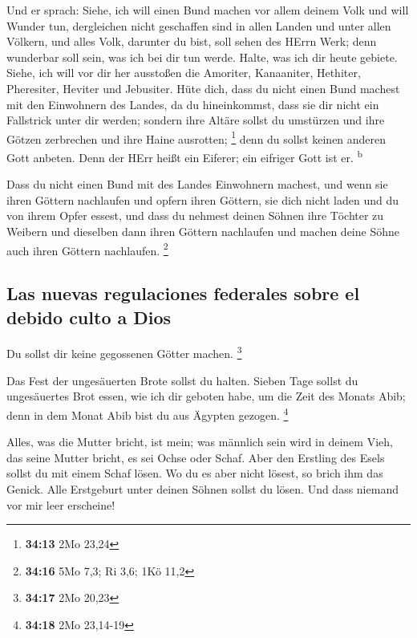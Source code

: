  Und er sprach: Siehe, ich will einen Bund machen vor
allem deinem Volk und will Wunder tun, dergleichen nicht geschaffen sind
in allen Landen und unter allen Völkern, und alles Volk, darunter du
bist, soll sehen des HErrn Werk; denn wunderbar soll sein, was ich bei
dir tun werde.  Halte, was ich dir heute gebiete. Siehe,
ich will vor dir her ausstoßen die Amoriter, Kanaaniter, Hethiter,
Pheresiter, Heviter und Jebusiter.  Hüte dich, dass du
nicht einen Bund machest mit den Einwohnern des Landes, da du
hineinkommst, dass sie dir nicht ein Fallstrick unter dir werden;
 sondern ihre Altäre sollst du umstürzen und ihre Götzen
zerbrechen und ihre Haine ausrotten; \footnote{\textbf{34:13} 2Mo 23,24}
 denn du sollst keinen anderen Gott anbeten. Denn der
HErr heißt ein Eiferer; ein eifriger Gott ist er. \textsuperscript{b}

 Dass du nicht einen Bund mit des Landes Einwohnern
machest, und wenn sie ihren Göttern nachlaufen und opfern ihren Göttern,
sie dich nicht laden und du von ihrem Opfer essest,  und
dass du nehmest deinen Söhnen ihre Töchter zu Weibern und dieselben dann
ihren Göttern nachlaufen und machen deine Söhne auch ihren Göttern
nachlaufen. \footnote{\textbf{34:16} 5Mo 7,3; Ri 3,6; 1Kö 11,2}

\hypertarget{las-nuevas-regulaciones-federales-sobre-el-debido-culto-a-dios}{%
\subsection{Las nuevas regulaciones federales sobre el debido culto a
Dios}\label{las-nuevas-regulaciones-federales-sobre-el-debido-culto-a-dios}}

 Du sollst dir keine gegossenen Götter machen.
\footnote{\textbf{34:17} 2Mo 20,23}

 Das Fest der ungesäuerten Brote sollst du halten. Sieben
Tage sollst du ungesäuertes Brot essen, wie ich dir geboten habe, um die
Zeit des Monats Abib; denn in dem Monat Abib bist du aus Ägypten
gezogen. \footnote{\textbf{34:18} 2Mo 23,14-19}

 Alles, was die Mutter bricht, ist mein; was männlich
sein wird in deinem Vieh, das seine Mutter bricht, es sei Ochse oder
Schaf.  Aber den Erstling des Esels sollst du mit einem
Schaf lösen. Wo du es aber nicht lösest, so brich ihm das Genick. Alle
Erstgeburt unter deinen Söhnen sollst du lösen. Und dass niemand vor mir
leer erscheine!

